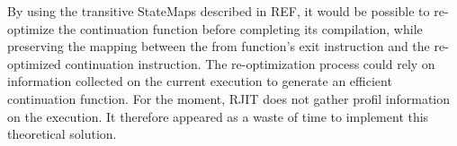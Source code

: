 By using the transitive StateMaps described in REF, it would be possible to re-optimize the continuation function before completing its compilation, while preserving the mapping between the from function's exit instruction and the re-optimized continuation instruction.
The re-optimization process could rely on information collected on the current execution to generate an efficient continuation function.
For the moment, RJIT does not gather profil information on the execution. 
It therefore appeared as a waste of time to implement this theoretical solution.\\

